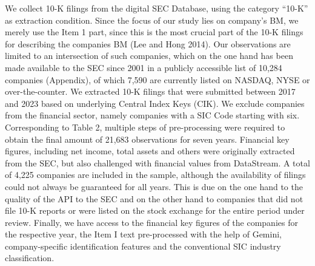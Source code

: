 \documentclass[
]{article}
\begin{document}
We collect 10-K filings from the digital SEC Database, using the
category ``10-K'' as extraction condition. Since the focus of our study
lies on company's BM, we merely use the Item 1 part, since this is the
most crucial part of the 10-K filings for describing the companies BM
(Lee and Hong 2014). Our observations are limited to an intersection of
such companies, which on the one hand has been made available to the SEC
since 2001 in a publicly accessible list of 10,284 companies (Appendix),
of which 7,590 are currently listed on NASDAQ, NYSE or over-the-counter.
We extracted 10-K filings that were submitted between 2017 and 2023
based on underlying Central Index Keys (CIK). We exclude companies from
the financial sector, namely companies with a SIC Code starting with
six. Corresponding to Table 2, multiple steps of pre-processing were
required to obtain the final amount of 21,683 observations for seven
years. Financial key figures, including net income, total assets and
others were originally extracted from the SEC, but also challenged with
financial values from DataStream. A total of 4,225 companies are
included in the sample, although the availability of filings could not
always be guaranteed for all years. This is due on the one hand to the
quality of the API to the SEC and on the other hand to companies that
did not file 10-K reports or were listed on the stock exchange for the
entire period under review. Finally, we have access to the financial key
figures of the companies for the respective year, the Item I text
pre-processed with the help of Gemini, company-specific identification
features and the conventional SIC industry classification.
\end{document}
